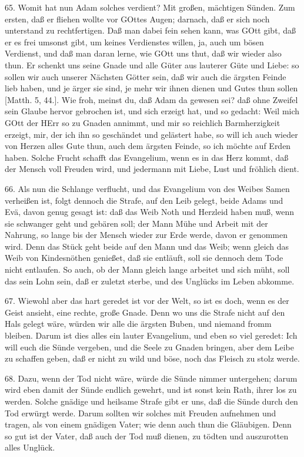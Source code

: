 65. Womit hat nun Adam solches verdient? Mit großen, mächtigen Sünden. Zum ersten,
daß er fliehen wollte vor GOttes Augen; darnach, daß er sich noch unterstand zu rechtfertigen. Daß man dabei fein sehen kann, was GOtt gibt, daß er es frei umsonst gibt, um keines Verdienstes willen, ja, auch um bösen Verdienst, und daß man daran lerne, wie GOtt uns thut, daß wir wieder also thun. Er schenkt uns seine Gnade und alle Güter aus lauterer Güte und Liebe: so sollen wir auch unserer Nächsten Götter sein, daß wir auch die ärgsten Feinde lieb haben, und je ärger sie sind, je mehr wir ihnen dienen und Gutes thun sollen [Matth. 5, 44.]. Wie froh, meinst du, daß Adam da gewesen sei? daß ohne Zweifel sein Glaube hervor gebrochen ist, und sich erzeigt hat, und so gedacht: Weil mich GOtt der HErr so zu Gnaden annimmt, und mir so reichlich Barmherzigkeit erzeigt, mir, der ich ihn so geschändet und gelästert habe, so will ich auch wieder von Herzen alles Gute thun, auch dem ärgsten Feinde, so ich möchte auf Erden haben. Solche Frucht schafft das Evangelium, wenn es in das Herz kommt, daß der Mensch voll Freuden wird, und jedermann mit Liebe, Lust und fröhlich dient.

66. Als nun die Schlange verflucht, und das Evangelium von des Weibes Samen verheißen ist, folgt dennoch die Strafe, auf den Leib gelegt, beide Adams und Evä, davon genug gesagt ist: daß das Weib Noth und Herzleid haben muß, wenn sie schwanger geht und gebären soll; der Mann Mühe und Arbeit mit der Nahrung, so lange bis der Mensch wieder zur Erde werde, davon er genommen wird. Denn das Stück geht beide auf den Mann und das Weib; wenn gleich das Weib von Kindesnöthen genießet, daß sie entläuft, soll sie dennoch dem Tode nicht entlaufen. So auch, ob der Mann gleich lange arbeitet und sich müht, soll das sein Lohn sein, daß er zuletzt sterbe, und des Unglücks im Leben abkomme.

67. Wiewohl aber das hart geredet ist vor der Welt, so ist es doch, wenn es der Geist ansieht, eine rechte, große Gnade. Denn wo uns die Strafe nicht auf den Hals gelegt wäre, würden wir alle die ärgsten Buben, und niemand fromm bleiben. Darum ist dies alles ein lauter Evangelium, und eben so viel geredet: Ich will euch die Sünde vergeben, und die Seele zu Gnaden bringen, aber dem Leibe zu schaffen geben, daß er nicht zu wild und böse, noch das Fleisch zu stolz werde.

68. Dazu, wenn der Tod nicht wäre, würde die Sünde nimmer untergehen; darum wird eben damit der Sünde endlich gewehrt, und ist sonst kein Rath, ihrer los zu werden. Solche gnädige und heilsame Strafe gibt er uns, daß die Sünde durch den Tod erwürgt werde. Darum sollten wir solches mit Freuden aufnehmen und tragen, als von einem gnädigen Vater; wie denn auch thun die Gläubigen. Denn so gut ist der Vater, daß auch der Tod muß dienen, zu tödten und auszurotten alles Unglück.

